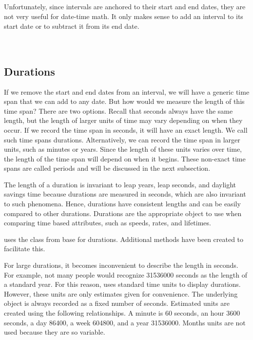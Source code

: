 \documentclass[article]{jss}
\begin{document}
\\
\\
\\
\\

Unfortunately, since intervals are anchored to their start and end dates, they are not very useful for date-time math. It only makes sense to add an interval to its start date or to subtract it from its end date.\\

\\
\\


\subsection{Durations}
\label{sec:durations}

If we remove the start and end dates from an interval, we will have a generic time span that we can add to any date. But how would we measure the length of this time span? There are two options. Recall that seconds always have the same length, but the length of larger units of time may vary depending on when they occur. If we record the time span in seconds, it will have an exact length. We call such time spans durations. Alternatively, we can record the time span in larger units, such as minutes or years. Since the length of these units varies over time, the length of the time span will depend on when it begins. These non-exact time spans are called periods and will be discussed in the next subsection.

The length of a duration is invariant to leap years, leap seconds, and daylight savings time because durations are measured in seconds, which are also invariant to such phenomena. Hence, durations have consistent lengths and can be easily compared to other durations. Durations are the appropriate object to use when comparing time based attributes, such as speeds, rates, and lifetimes.

 uses the  class from base  for durations. Additional  methods have been created to facilitate this. 

For large durations, it becomes inconvenient to describe the length in seconds. For example, not many people would recognize 31536000 seconds as the length of a standard year. For this reason,  uses standard time units to display durations. However, these units are only estimates given for convenience. The underlying object is always recorded as a fixed number of seconds. Estimated units are created using the following relationships. A minute is 60 seconds, an hour 3600 seconds, a day 86400, a week 604800, and a year 31536000. Months units are not used because they are so variable.
\end{document}
